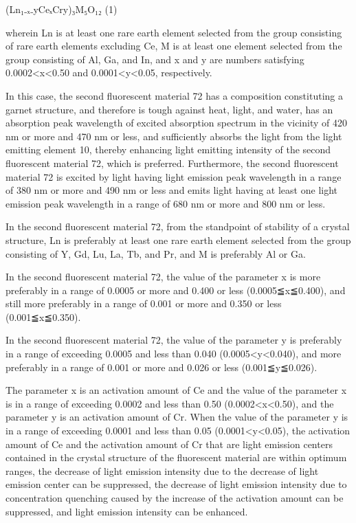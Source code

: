 \documentclass[11pt,a4paper]{article}
\begin{document}
(Ln₁₋ₓ₋yCeₓCry)₃M₅O₁₂ (1)

wherein Ln is at least one rare earth element selected from the group consisting of rare earth elements excluding Ce, M is at least one element selected from the group consisting of Al, Ga, and In, and x and y are numbers satisfying 0.0002<x<0.50 and 0.0001<y<0.05, respectively.

In this case, the second fluorescent material 72 has a composition constituting a garnet structure, and therefore is tough against heat, light, and water, has an absorption peak wavelength of excited absorption spectrum in the vicinity of 420 nm or more and 470 nm or less, and sufficiently absorbs the light from the light emitting element 10, thereby enhancing light emitting intensity of the second fluorescent material 72, which is preferred. Furthermore, the second fluorescent material 72 is excited by light having light emission peak wavelength in a range of 380 nm or more and 490 nm or less and emits light having at least one light emission peak wavelength in a range of 680 nm or more and 800 nm or less.

In the second fluorescent material 72, from the standpoint of stability of a crystal structure, Ln is preferably at least one rare earth element selected from the group consisting of Y, Gd, Lu, La, Tb, and Pr, and M is preferably Al or Ga.

In the second fluorescent material 72, the value of the parameter x is more preferably in a range of 0.0005 or more and 0.400 or less (0.0005≦x≦0.400), and still more preferably in a range of 0.001 or more and 0.350 or less (0.001≦x≦0.350).

In the second fluorescent material 72, the value of the parameter y is preferably in a range of exceeding 0.0005 and less than 0.040 (0.0005<y<0.040), and more preferably in a range of 0.001 or more and 0.026 or less (0.001≦y≦0.026).

The parameter x is an activation amount of Ce and the value of the parameter x is in a range of exceeding 0.0002 and less than 0.50 (0.0002<x<0.50), and the parameter y is an activation amount of Cr. When the value of the parameter y is in a range of exceeding 0.0001 and less than 0.05 (0.0001<y<0.05), the activation amount of Ce and the activation amount of Cr that are light emission centers contained in the crystal structure of the fluorescent material are within optimum ranges, the decrease of light emission intensity due to the decrease of light emission center can be suppressed, the decrease of light emission intensity due to concentration quenching caused by the increase of the activation amount can be suppressed, and light emission intensity can be enhanced.
\end{document}
